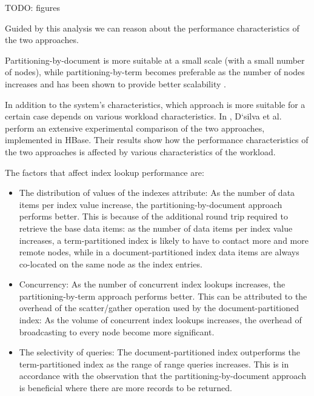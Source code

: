 TODO: figures

\bigskip

Guided by this analysis we can reason about the performance characteristics of the two approaches.

Partitioning-by-document is more suitable at a small scale (with a small number of nodes),
while partitioning-by-term becomes preferable as the number of nodes increases and has been shown to provide better
scalability \cite{kejriwal:slik}.

In addition to the system's characteristics, which approach is more suitable for a certain case depends on various
workload characteristics.
In \cite{dsilva:tworings}, D`silva et al. perform an extensive experimental comparison of the two approaches,
implemented in HBase.
Their results show how the performance characteristics of the two approaches is affected by various characteristics of
the workload.

The factors that affect index lookup performance are:
\begin{itemize}

  \item The distribution of values of the indexes attribute:
  As the number of data items per index value increase, the partitioning-by-document approach performs better.
  This is because of the additional round trip required to retrieve the base data items:
  as the number of data items per index value increases, a term-partitioned index is likely to have to contact
  more and more remote nodes, while in a document-partitioned index data items are always co-located on the same node as
  the index entries.

  \item Concurrency:
  As the number of concurrent index lookups increases, the partitioning-by-term approach performs better.
  This can be attributed to the overhead of the scatter/gather operation used by the document-partitioned index:
  As the volume of concurrent index lookups increases, the overhead of broadcasting to every node become more significant.

  \item The selectivity of queries:
  The document-partitioned index outperforms the term-partitioned index as the range of range queries increases.
  This is in accordance with the observation that the partitioning-by-document approach is beneficial where there are
  more records to be returned.

\end{itemize}

